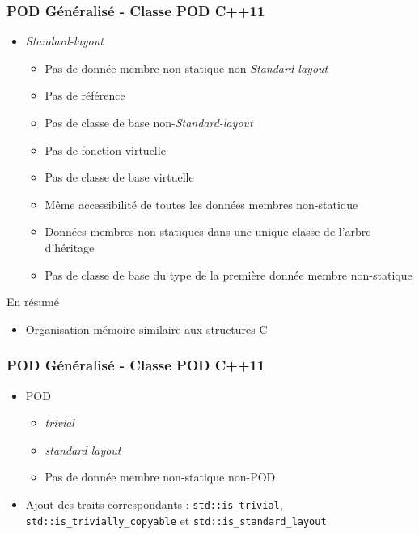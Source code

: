\documentclass[C++.tex]{subfiles}
\begin{document}
\begin{frame}[fragile]
	\frametitle{POD Généralisé - Classe POD C++11}
	\begin{itemize}
		\item \textit{Standard-layout}
		\begin{itemize}
			\item Pas de donnée membre non-statique non-\textit{Standard-layout} 
			\item Pas de référence
			\item Pas de classe de base non-\textit{Standard-layout}
			\item Pas de fonction virtuelle 
			\item Pas de classe de base virtuelle
			\item Même accessibilité de toutes les données membres non-statique
			\item Données membres non-statiques dans une unique classe de l'arbre d'héritage


			\item Pas de classe de base du type de la première donnée membre non-statique

		\end{itemize}
	\end{itemize}

	\pause

	\begin{block}{En résumé}
		\begin{itemize}
			\item Organisation mémoire similaire aux structures C
		\end{itemize}
	\end{block}
\end{frame}

\begin{frame}[fragile]
	\frametitle{POD Généralisé - Classe POD C++11}
	\begin{itemize}
		\item POD
		\begin{itemize}
			\item \textit{trivial}
			\item \textit{standard layout}
			\item Pas de donnée membre non-statique non-POD
		\end{itemize}
		\item Ajout des traits correspondants : \lstinline|std::is_trivial|, \lstinline|std::is_trivially_copyable| et \lstinline|std::is_standard_layout|
	\end{itemize}
\end{frame}
\end{document}
